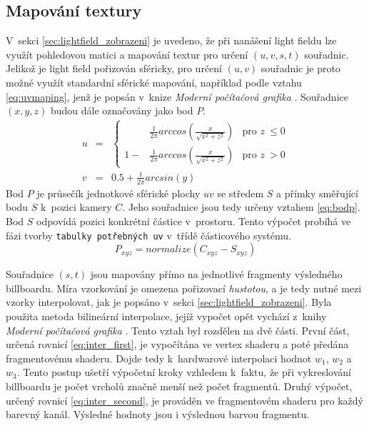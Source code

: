 \subsection{Mapování textury}
\label{sec:texture_mapping}
V~sekci \ref{sec:lightfield_zobrazeni} je uvedeno, že při nanášení light fieldu lze využít pohledovou matici a mapování textur pro určení $(u, v, s, t)$ souřadnic. Jelikož je light field pořizován sféricky, pro určení $(u, v)$ souřadnic je proto možné využít standardní sférické mapování, například podle vztahu \ref{eq:uvmaping}, jenž je popsán v~knize \emph{Moderní počítačová grafika} \cite[kapitola 13.1.1]{zara2004moderni}. Souřadnice $(x,y,z)$ budou dále označovány jako bod $P$.
\begin{equation}
\label{eq:uvmaping}
    \begin{array}{lll}
        u& =& \left\{ 
        \begin{array}{ccl}
        & \frac{1}{2\pi}arccos(\frac{x}{\sqrt{x^2 + z^2}}) & \text{pro } z~\leq 0 \\
        1 - & \frac{1}{2\pi}arccos(\frac{x}{\sqrt{x^2 + z^2}}) & \text{pro } z~> 0
        \end{array} 
        \right. 
        \\[1cm]
        v& =& 0.5 + \frac{1}{2\pi}arcsin(y)
    \end{array}
\end{equation}
 Bod $P$ je průsečík jednotkové sférické plochy $uv$ se středem $S$ a přímky směřující bodu $S$ k~pozici kamery $C$. Jeho souřadnice jsou tedy určeny vztahem \ref{eq:bodp}. Bod $S$ odpovídá pozici konkrétní částice v~prostoru. Tento výpočet probíhá ve fázi tvorby \texttt{tabulky potřebných uv} v~třídě částicového systému.
\begin{equation}
\label{eq:bodp}
      P_{xyz} = normalize(C_{xyz} - S_{xyz})
\end{equation}

Souřadnice ${(s, t)}$ jsou mapovány přímo na jednotlivé fragmenty výsledného billboardu. Míra vzorkování je omezena pořizovací \emph{hustotou}, a je tedy nutné mezi vzorky interpolovat, jak je popsáno v~sekci \ref{sec:lightfield_zobrazeni}. Byla použita metoda bilineární interpolace, jejíž vypočet opět vychází z~knihy \emph{Moderní počítačová grafika} \cite[kapitola 22.6.4]{zara2004moderni}. Tento vztah byl rozdělen na dvě části. První část, určená rovnicí \ref{eq:inter_first}, je vypočítána ve vertex shaderu a poté předána fragmentovému shaderu. Dojde tedy k~hardwarové interpolaci hodnot ${w_1}$, ${w_2}$ a ${w_3}$. Tento postup ušetří výpočetní kroky vzhledem k~faktu, že při vykreslování billboardu je počet vrcholů značně menší než počet fragmentů. Druhý výpočet, určený rovnicí \ref{eq:inter_second}, je prováděn ve fragmentovém shaderu pro každý barevný kanál. Výsledné hodnoty jsou i výslednou barvou fragmentu.   

